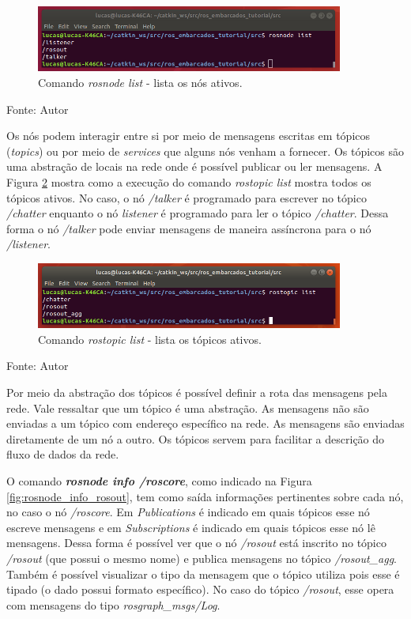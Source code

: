 \begin{figure}[!htb]
  \centering
  \caption{Comando \textit{rosnode list} - lista os nós ativos.}
  \label{fig:rosnode_list}
  \includegraphics[width=0.9\textwidth]{./img/fundamentacao/rosnode_list.png}
\end{figure}

Fonte: Autor

Os nós podem interagir entre si por meio de mensagens escritas em tópicos (\textit{topics}) ou por meio de \textit{services} que alguns nós venham a fornecer.
Os tópicos são uma abstração de locais na rede onde é possível publicar ou ler mensagens. 
A Figura \ref{fig:rostopic_list} mostra como a execução do comando \textit{rostopic list} mostra todos os tópicos ativos. 
No caso, o nó \textit{/talker} é programado para escrever no tópico \textit{/chatter} enquanto o nó \textit{listener} é programado para ler o tópico \textit{/chatter}. 
Dessa forma o nó \textit{/talker} pode enviar mensagens de maneira assíncrona para o nó \textit{/listener}.

\begin{figure}[!htb]
  \centering
  \caption{Comando \textit{rostopic list} - lista os tópicos ativos.}
  \label{fig:rostopic_list}
  \includegraphics[width=0.9\textwidth]{./img/fundamentacao/rostopic_list.png}
\end{figure}

Fonte: Autor

Por meio da abstração dos tópicos é possível definir a rota das mensagens pela rede. Vale ressaltar que um tópico é uma abstração. 
As mensagens não são enviadas a um tópico com endereço específico na rede. 
As mensagens são enviadas diretamente de um nó a outro. 
Os tópicos servem para facilitar a descrição do fluxo de dados da rede.

\pagebreak

O comando \textbf{\textit{rosnode info /roscore}}, como indicado na Figura \ref{fig:rosnode_info_rosout}, tem como saída informações pertinentes sobre cada nó, no caso o nó \textit{/roscore}.
Em \textit{Publications} é indicado em quais tópicos esse nó escreve mensagens e em \textit{Subscriptions} é indicado em quais tópicos esse nó lê mensagens.
Dessa forma é possível ver que o nó \textit{/rosout} está inscrito no tópico \textit{/rosout} (que possui o mesmo nome) e publica mensagens no tópico \textit{/rosout\_agg}.
Também é possível visualizar o tipo da mensagem que o tópico utiliza pois esse é tipado (o dado possui formato específico).
No caso do tópico \textit{/rosout}, esse opera com mensagens do tipo \textit{rosgraph\_msgs/Log}.

